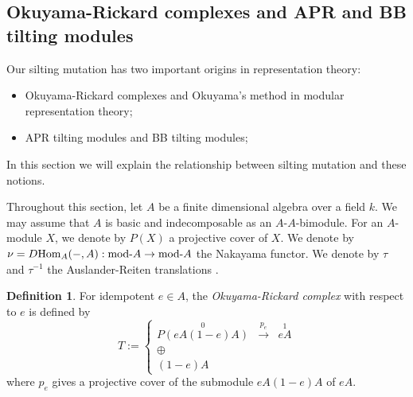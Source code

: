 \documentclass[a4paper,reqno]{amsart}
\theoremstyle{definition}
\newtheorem{definition}[theorem]{Definition}
\newcommand{\modu}[1]{{\rm{mod}}\text{-}#1} %
\newcommand{\homo}[3]{{\rm{Hom}}_{#1}(#2, #3)} %
\begin{document}

\subsection{Okuyama-Rickard complexes and APR and BB tilting modules} \label{Examples of silting subcategories and objects}

Our silting mutation has two important origins in representation theory: 
\begin{itemize}
\item Okuyama-Rickard complexes and Okuyama's method in modular representation theory;
\item APR tilting modules and BB tilting modules;
\end{itemize}
In this section we will explain the relationship between silting mutation and these notions.

Throughout this section, let $A$ be a finite dimensional algebra over a field $k$. 
We may assume that $A$ is basic and indecomposable as an $A$-$A$-bimodule.
For an $A$-module $X$, we denote by $P(X)$ a projective cover of $X$.
We denote by $\nu =D\homo{A}{-}{A}:\modu{A}\to\modu{A}$ the Nakayama functor.
We denote by $\tau$ and $\tau^{-1}$ the Auslander-Reiten translations \cite{ARS,ASS}. 


\begin{definition}
For idempotent $e\in A$,
the \emph{Okuyama-Rickard complex} with respect to $e$ is defined by
\begin{equation}\label{OR complex}
T:=\left\{\begin{array}{ccc}
\stackrel{0}{P(eA(1-e)A)}&\stackrel{p_e}{\longrightarrow}&\stackrel{1}{eA}\\
\oplus&&\\
(1-e)A&&
\end{array}\right.
\end{equation}
where $p_e$ gives a projective cover of the submodule $eA(1-e)A$ of $eA$.
\end{definition}
\end{document}
